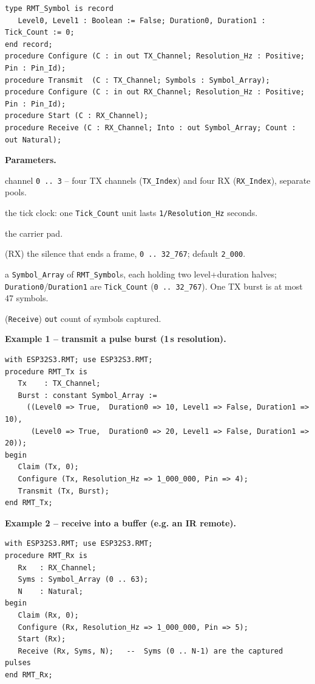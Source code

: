 \begin{lstlisting}
type RMT_Symbol is record
   Level0, Level1 : Boolean := False; Duration0, Duration1 : Tick_Count := 0;
end record;
procedure Configure (C : in out TX_Channel; Resolution_Hz : Positive; Pin : Pin_Id);
procedure Transmit  (C : TX_Channel; Symbols : Symbol_Array);
procedure Configure (C : in out RX_Channel; Resolution_Hz : Positive; Pin : Pin_Id);
procedure Start (C : RX_Channel);
procedure Receive (C : RX_Channel; Into : out Symbol_Array; Count : out Natural);
\end{lstlisting}

\textbf{Parameters.}
\begin{description}[style=nextline]
\item[\texttt{Index}] channel \texttt{0\,..\,3} -- four TX channels
  (\texttt{TX\_Index}) and four RX (\texttt{RX\_Index}), separate pools.
\item[\texttt{Resolution\_Hz}] the tick clock: one \texttt{Tick\_Count} unit lasts
  \texttt{1/Resolution\_Hz} seconds.
\item[\texttt{Pin}] the carrier pad.
\item[\texttt{Idle\_Ticks}] (RX) the silence that ends a frame,
  \texttt{0\,..\,32\_767}; default \texttt{2\_000}.
\item[\texttt{Symbols} / \texttt{Into}] a \texttt{Symbol\_Array} of
  \texttt{RMT\_Symbol}s, each holding two level+duration halves;
  \texttt{Duration0}/\allowbreak\texttt{Duration1} are \texttt{Tick\_Count}
  (\texttt{0\,..\,32\_767}). One TX burst is at most 47 symbols.
\item[\texttt{Count}] (\texttt{Receive}) \texttt{out} count of symbols captured.
\end{description}

\textbf{Example 1 -- transmit a pulse burst (1\,\textmu s resolution).}
\begin{lstlisting}
with ESP32S3.RMT; use ESP32S3.RMT;
procedure RMT_Tx is
   Tx    : TX_Channel;
   Burst : constant Symbol_Array :=
     ((Level0 => True,  Duration0 => 10, Level1 => False, Duration1 => 10),
      (Level0 => True,  Duration0 => 20, Level1 => False, Duration1 => 20));
begin
   Claim (Tx, 0);
   Configure (Tx, Resolution_Hz => 1_000_000, Pin => 4);
   Transmit (Tx, Burst);
end RMT_Tx;
\end{lstlisting}

\textbf{Example 2 -- receive into a buffer (e.g. an IR remote).}
\begin{lstlisting}
with ESP32S3.RMT; use ESP32S3.RMT;
procedure RMT_Rx is
   Rx   : RX_Channel;
   Syms : Symbol_Array (0 .. 63);
   N    : Natural;
begin
   Claim (Rx, 0);
   Configure (Rx, Resolution_Hz => 1_000_000, Pin => 5);
   Start (Rx);
   Receive (Rx, Syms, N);   --  Syms (0 .. N-1) are the captured pulses
end RMT_Rx;
\end{lstlisting}

